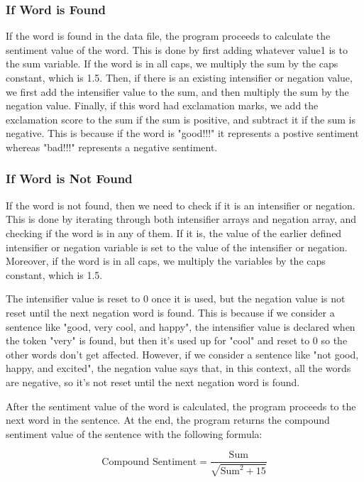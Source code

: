 \documentclass[12pt]{article}
\begin{document}
\subsubsection{If Word is Found}

If the word is found in the data file, the program proceeds to calculate the sentiment value of the word.
This is done by first adding whatever value1 is to the sum variable.
If the word is in all caps, we multiply the sum by the caps constant, which is 1.5.
Then, if there is an existing intensifier or negation value, we first add the intensifier value to the sum, and then multiply the sum by the negation value.
Finally, if this word had exclamation marks, we add the exclamation score to the sum if the sum is positive, and subtract it if the sum is negative.
This is because if the word is "good!!!" it represents a postive sentiment whereas "bad!!!" represents a negative sentiment.

\subsubsection{If Word is Not Found}

If the word is not found, then we need to check if it is an intensifier or negation.
This is done by iterating through both intensifier arrays and negation array, and checking if the word is in any of them.
If it is, the value of the earlier defined intensifier or negation variable is set to the value of the intensifier or negation.
Moreover, if the word is in all caps, we multiply the variables by the caps constant, which is 1.5.

The intensifier value is reset to 0 once it is used, but the negation value is not reset until the next negation word is found.
This is because if we consider a sentence like "good, very cool, and happy", the intensifier value is declared when the token "very" is found, but then it's used up for "cool" and reset to 0 so the other words don't get affected.
However, if we consider a sentence like "not good, happy, and excited", the negation value says that, in this context, all the words are negative, so it's not reset until the next negation word is found.

\medskip

After the sentiment value of the word is calculated, the program proceeds to the next word in the sentence.
At the end, the program returns the compound sentiment value of the sentence with the following formula:

\[ \text{Compound Sentiment} = \frac{\text{Sum}}{\sqrt{\text{Sum}^2 + 15}} \]
\end{document}
